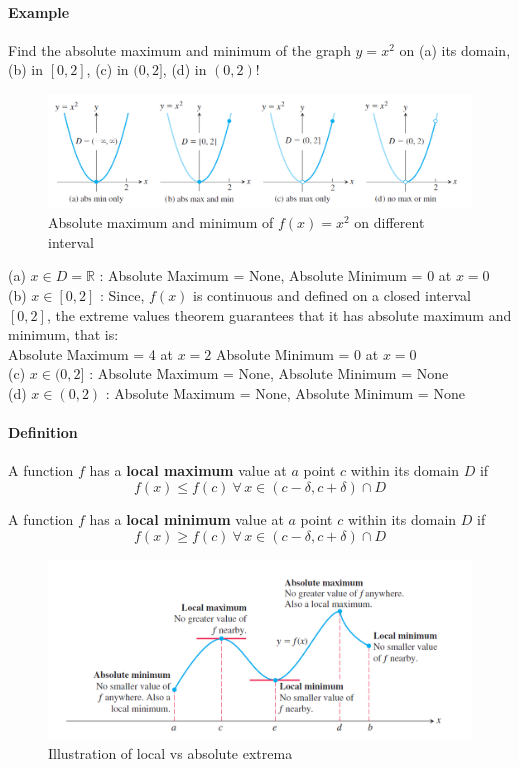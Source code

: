 \documentclass[12pt]{article}
\begin{document}
\paragraph{Example} Find the absolute maximum and minimum of the graph $y = x^2$ on (a) its domain, (b) in $[0, 2]$, (c) in $(0, 2]$, (d) in $(0, 2)$!

\begin{figure}[h!]
    \centering
    \includegraphics[width=1\linewidth]{Images/absolute max min.png}
    \caption{Absolute maximum and minimum of $f(x) = x^2$ on different interval}
\end{figure}

\noindent 
(a) $x \in D = \mathbb{R}$ : Absolute Maximum = None, Absolute Minimum = 0 at $x = 0$ \\
(b) $x \in [0, 2]$ : Since, $f(x)$ is continuous and defined on a closed interval $[0, 2]$, the extreme values theorem guarantees that it has absolute maximum and minimum,
that is: \\
Absolute Maximum = 4 at $x = 2$ Absolute Minimum = 0 at $x = 0$ \\
(c) $x \in (0, 2]$ : Absolute Maximum = None, Absolute Minimum = None \\
(d) $x \in (0, 2)$ : Absolute Maximum = None, Absolute Minimum = None 

\paragraph{Definition}
A function $f$ has a \textbf{local maximum} value at $a$ point $c$ within its
domain $D$ if 
\[ 
    f(x) \leq f(c)\: \forall\, x \in (c - \delta, c + \delta) \cap D
\]

\noindent 
A function $f$ has a \textbf{local minimum} value at $a$ point $c$ within its domain $D$ if
\[ 
    f(x) \geq f(c)\: \forall \, x \in (c - \delta, c + \delta) \cap D
\]

\begin{figure}[h!]
     \centering
     \includegraphics[width=1\linewidth]{Images/absolute and local extrema.png}
     \caption{Illustration of local vs absolute extrema}
\end{figure}
\end{document}
